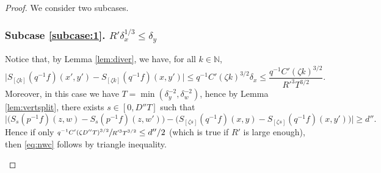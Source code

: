 \documentclass[10pt]{amsart}
\newcounter{case}
\newcounter{subcase}
\theoremstyle{definition}
\theoremstyle{plain}
\newcommand\NN{\mathbb{N}}
\begin{document}
\begin{proof}
We consider two subcases.

\label{subcase:1}
\subsubsection*{Subcase \ref{subcase:1}. $R'\delta_x^{1/3}\leq \delta_y$}
Notice that, by Lemma \ref{lem:diver}, we have, for all $k\in \NN$,
\[
\bigl|S_{[\zeta k]}(q^{-1}f)(x',y')-
S_{[\zeta k]}(q^{-1}f)(x,y')\bigr|\leq q^{-1}C'(\zeta k)^{3/2}\delta_x\leq \frac{q^{-1}C'(\zeta k)^{3/2}}{R'^{3} T^{3/2}}.
\]
Moreover, in this case we have $T =\min ( \delta_y^{-2}, \delta_w^{-2})$, hence by Lemma \ref{lem:vertsplit}, there exists $s\in [0,D''T]$
such that
\[
\bigl|\bigl(S_s(p^{-1}f)(z,w)-S_s(p^{-1}f)(z,w')\bigr)-
\bigl(S_{[\zeta s]}(q^{-1}f)(x,y)-S_{[\zeta s]}(q^{-1}f)(x,y')\bigr)\bigr|\geq
d''.
\]
Hence if only
$\sfrac{q^{-1}C'(\zeta D''T)^{3/2}}{R'^{3}T^{3/2}}\leq d''/2$ (which is true if $R'$ is large enough), then \eqref{eq:nwc} follows by triangle inequality.

\label{subcase:2}

\end{proof}
\end{document}
